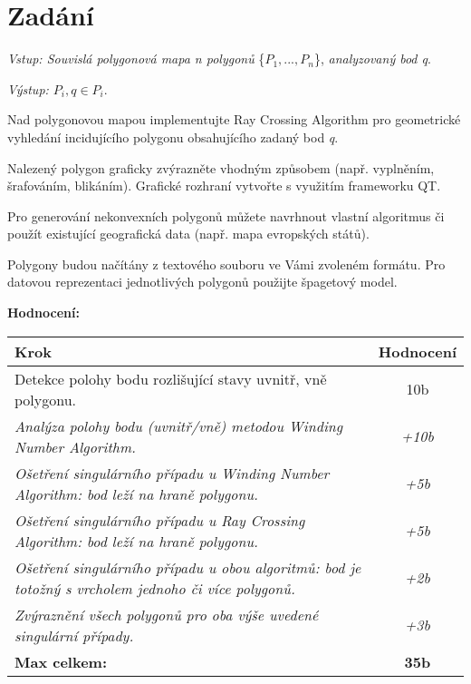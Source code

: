 \chapter*{Zadání}

\par\emph{Vstup: Souvislá polygonová mapa n polygonů} \{$P_1, ..., P_n$\}, \emph{analyzovaný bod q}.
\par \emph{Výstup: $P_i, q \in P_i$}.

\par Nad polygonovou mapou implementujte Ray Crossing Algorithm pro geometrické vyhledání incidujícího polygonu obsahujícího zadaný bod \emph{q}.
\par Nalezený polygon graficky zvýrazněte vhodným způsobem (např. vyplněním, šrafováním, blikáním). Grafické rozhraní vytvořte s využitím frameworku QT.
\par Pro generování nekonvexních polygonů můžete navrhnout vlastní algoritmus či použít existující geografická data (např. mapa evropských států).
\par Polygony budou načítány z textového souboru ve Vámi zvoleném formátu. Pro datovou reprezentaci jednotlivých polygonů použijte špagetový model.
\bigbreak

\par\textbf{\large Hodnocení:}
\bigbreak
\begin{center}
    \begin{tabular}{|p{14.2cm}|c|} 
     \hline\large
         \textbf{Krok} & \textbf{Hodnocení}\\ %
             \hline\hline
             \small Detekce polohy bodu rozlišující stavy uvnitř, vně polygonu. & \small10b \\ 
             \hline
             \emph{\small Analýza polohy bodu (uvnitř/vně) metodou Winding Number Algorithm.} & \emph{\small +10b} \\
             \hline
             \emph{\small Ošetření singulárního případu u Winding Number Algorithm: bod leží na hraně polygonu.} & \emph{\small +5b} \\
             \hline
             \emph{\small Ošetření singulárního případu u Ray Crossing Algorithm: bod leží na hraně polygonu.} & \emph{\small +5b} \\
             \hline
             \emph{\small Ošetření singulárního případu u obou algoritmů: bod je totožný s vrcholem jednoho či více polygonů.} & \emph{\small +2b}\\ 
             \hline
             \emph{\small Zvýraznění všech polygonů pro oba výše uvedené singulární případy.} & \emph{\small +3b}\\  
             \hline
             \textbf{Max celkem:} & \textbf{35b}\\ %
             \hline
    \end{tabular}
\end{center}